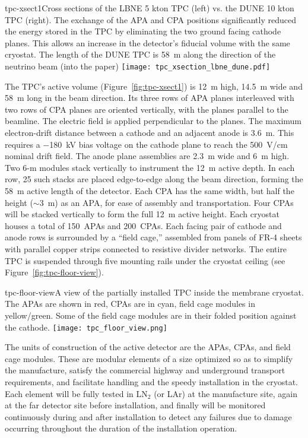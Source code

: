 \begin{cdrfigure}{tpc-xsect1}{Cross sections of the LBNE 5 kton TPC (left) vs. the DUNE 10 kton TPC (right).  The exchange of the APA and CPA positions significantly reduced the energy stored in the TPC by eliminating the two ground facing cathode planes. This allows an increase in the detector's fiducial volume with the same cryostat.  The length of the DUNE TPC is  58~m along the direction of the neutrino beam (into the paper)}
\texttt{[image: tpc\_xsection\_lbne\_dune.pdf]}
\end{cdrfigure}


The TPC's active volume (Figure~\ref{fig:tpc-xsect1}) is 12~m high, 14.5~m wide and 58~m long in the beam direction. 
Its three rows of APA planes interleaved with two rows of CPA planes 
are oriented vertically, with the planes parallel to the beamline. The  
electric field is applied perpendicular to the planes.
The maximum electron-drift distance between a cathode and an adjacent 
anode is 3.6~m. This requires a $-$180~kV bias voltage on the cathode plane to reach the 500~V/cm nominal drift field. The anode plane assemblies are 
2.3~m wide and 6~m high. Two 6-m modules stack vertically to 
instrument the 12~m active depth. In each row, 25 such stacks are placed edge-to-edge 
along the beam direction, forming the 58~m active length of the detector.  Each CPA has the same width, but half the height ($\sim$3~m) as an APA, for ease of assembly and transportation.  Four CPAs will be stacked vertically to form the full 12~m active height. 
Each cryostat houses a total of 150~APAs and 200~CPAs.
Each facing pair of cathode and anode rows is surrounded by a 
``field cage,'' assembled from panels of FR-4 sheets with parallel copper strips connected to resistive divider networks. 
The entire TPC is suspended through five mounting rails under the cryostat ceiling (see Figure~\ref{fig:tpc-floor-view}).


\begin{cdrfigure}{tpc-floor-view}{A view of the partially installed TPC inside the membrane cryostat.  The APAs are shown in red, CPAs are in cyan, field cage modules in yellow/green. Some of the field cage modules are in their folded position against the cathode.}
\texttt{[image: tpc\_floor\_view.png]}
\end{cdrfigure}

The units of construction of the active detector are the APAs, CPAs, and field cage modules. These are modular elements of a size optimized
so as to simplify the manufacture, satisfy the commercial highway and underground transport requirements,
and facilitate handling and the speedy installation in the cryostat.  Each element will be fully tested in LN$_2$ (or LAr) at the manufacture site,
again at the far detector site before installation, and finally will be monitored continuously during and
after installation to detect any failures due to damage occurring throughout the duration
of the installation operation. 


